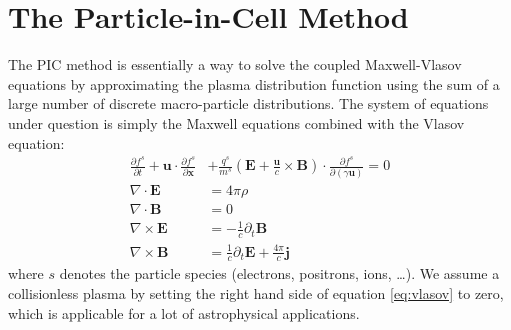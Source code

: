 \section{The Particle-in-Cell Method}
\label{sec:particle-cell-method}
The PIC method is essentially a way to solve the coupled Maxwell-Vlasov
equations by approximating the plasma distribution function using the
sum of a large number of discrete macro-particle distributions. The
system of equations under question is simply the Maxwell equations
combined with the Vlasov equation:
\begin{align}
  \frac{\partial f^{s}}{\partial t} + \mathbf{u}\cdot\frac{\partial f^s}{\partial \mathbf{x}} &+ \frac{q^s}{m^s}\left(\mathbf{E} + \frac{\mathbf{u}}{c}\times \mathbf{B}\right)\cdot\frac{\partial f^s}{\partial (\gamma \mathbf{u})} = 0 \label{eq:vlasov}\\
  \nabla\cdot \mathbf{E} &= 4\pi\rho \\
  \nabla\cdot \mathbf{B} &= 0 \\
  \nabla\times \mathbf{E} &= -\frac{1}{c}\partial_t \mathbf{B} \\
  \nabla\times \mathbf{B} &= \frac{1}{c}\partial_t \mathbf{E} + \frac{4\pi}{c} \mathbf{j}
\end{align}
where $s$ denotes the particle species (electrons, positrons, ions,
\dots). We assume a collisionless plasma by setting the right hand
side of equation \eqref{eq:vlasov} to zero, which is applicable for a lot of
astrophysical applications.

